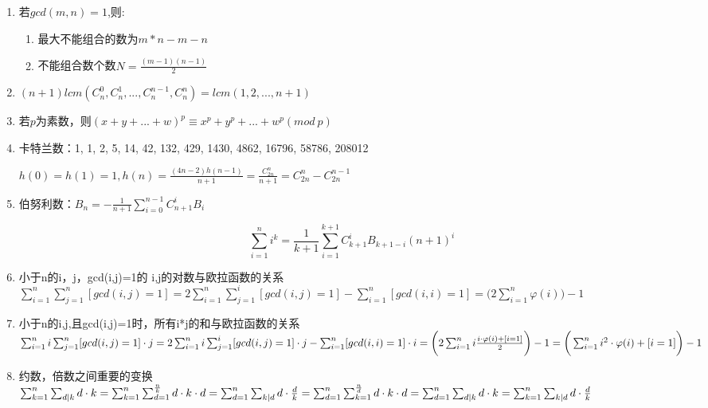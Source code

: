 \begin{enumerate}
	\item 若$gcd(m,n)=1$,则:
	
	\begin{enumerate}
		\item 最大不能组合的数为$m*n-m-n$
		\item 不能组合数个数$N=\frac{(m-1)(n-1)}{2}$
	\end{enumerate}
	
	\item $(n+1)lcm(C_n^0,C_n^1,...,C_n^{n-1},C_n^{n})=lcm(1,2,...,n+1)$
	
	\item 若$p$为素数，则$(x+y+...+w)^p\equiv x^p+y^p+...+w^p(mod\ p)$
	
	\item 卡特兰数：1, 1, 2, 5, 14, 42, 132, 429, 1430, 4862, 16796, 58786, 208012
	
	$h(0)=h(1)=1,h(n)=\frac{(4n-2)h(n-1)}{n+1}=\frac{C_{2n}^n}{n+1}=C_{2n}^n-C_{2n}^{n-1}$
	
	\item 伯努利数：$B_n = -\frac{1}{n+1} \sum_{i=0}^{n-1} C_{n+1}^i B_i$
	
	$$\sum_{i=1}^n i^k = \frac{1}{k+1} \sum_{i=1}^{k+1}C_{k+1}^i B_{k+1-i}(n+1)^i$$
	


	\item 小于n的i，j，gcd(i,j)=1的 i,j的对数与欧拉函数的关系 $\sum_{i=1}^n\sum_{j=1}^n[gcd(i,j)=1]=2\sum_{i=1}^n\sum_{j=1}^i[gcd(i,j)=1]-\sum_{i=1}^n[gcd(i,i)=1]=\big(2\sum_{i=1}^n\varphi(i)\big)-1$
	
	\item 小于n的i,j,且gcd(i,j)=1时，所有i*j的和与欧拉函数的关系 $\sum_{i=1}^{n}i\sum_{j=1}^{n}[gcd(i,j)=1]\cdot j=2\sum_{i=1}^{n}i\sum_{j=1}^i[gcd(i,j)=1]\cdot j-\sum_{i=1}^n[gcd(i,i)=1]\cdot i\\
	=\bigg(2\sum_{i=1}^ni\frac{i\cdot\varphi(i)+[i=1]}{2}\bigg)-1=\bigg(\sum_{i=1}^ni^2\cdot\varphi(i)+[i=1]\bigg)-1$
	
	\item 约数，倍数之间重要的变换 $
	\sum_{k=1}^n\sum_{d|k}d\cdot k=\sum_{k=1}^n\sum_{d=1}^{\frac nk}d\cdot k\cdot d=\sum_{d=1}^n\sum_{k|d}d\cdot \frac dk=\sum_{d=1}^n\sum_{k=1}^{\frac nd}d\cdot k\cdot d=\sum_{d=1}^n\sum_{d|k}d\cdot k=\sum_{k=1}^n\sum_{k|d} d\cdot\frac dk\\$
	

\end{enumerate}
